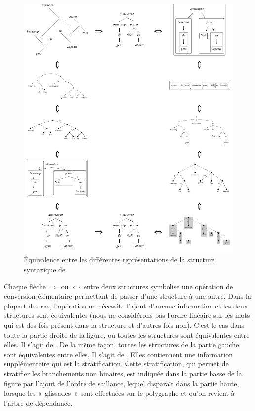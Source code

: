 \begin{figure}
\caption{\label{fig:rosace}Équivalence entre les différentes représentations de la structure syntaxique de }
\includegraphics[width=\textwidth]{figures/graphs-collection.pdf}
\end{figure}

Chaque flèche $\Rightarrow$ ou $\Leftrightarrow$ entre deux structures symbolise une opération de conversion élémentaire permettant de passer d’une structure à une autre. Dans la plupart des cas, l’opération ne nécessite l’ajout d’aucune information et les deux structures sont équivalentes (nous ne considérons pas l’ordre linéaire sur les mots qui est des fois présent dans la structure et d’autres fois non). C’est le cas dans toute la partie droite de la figure, où toutes les structures sont équivalentes entre elles. Il s'agit de . De la même façon, toutes les structures de la partie gauche sont équivalentes entre elles. Il s'agit de . Elles contiennent une information supplémentaire qui est la stratification. Cette stratification, qui permet de stratifier les branchements non binaires, est indiquée dans la partie basse de la figure par l’ajout de l’ordre de saillance, lequel disparaît dans la partie haute, lorsque les «~glissades~» sont effectuées sur le polygraphe et qu’on revient à l’arbre de dépendance.

